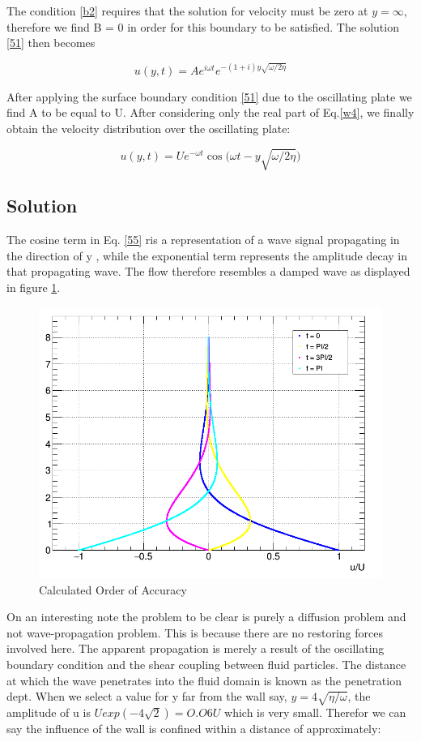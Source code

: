 \documentclass[paper=a4, fontsize=12pt, abstract=on]{scrartcl}
\numberwithin{equation}{section}		%
\numberwithin{figure}{section}			%
\numberwithin{table}{section}				%
\begin{document}
The condition \ref{b2} requires that the solution for velocity must be zero at $y = \infty$, therefore we find B = 0 in order for this boundary to be satisfied. The solution \ref{51} then becomes

\begin{equation}
\label{54}
u(y,t) = Ae^{i\omega t}e^{-(1+i)y\sqrt{\omega/2\eta}}
\end{equation}


After applying the surface boundary condition \ref{51} due to the oscillating plate we find A to be equal to U. After considering only the real part of Eq.\ref{w4}, we finally obtain the velocity distribution over the oscillating plate:

\begin{equation}
\label{55}
u(y,t) = Ue^{-\omega t}\cos\Big(\omega t - y\sqrt{\omega/2\eta}\Big)
\end{equation}

\subsection{Solution}

The cosine term in Eq. \ref{55} ris a representation of a wave signal propagating in the direction of y , while the exponential term represents the amplitude decay in that propagating wave. The flow therefore resembles a damped wave as displayed in figure \ref{q1}. 


\begin{figure}[H]
\centering
\includegraphics[width=0.70\linewidth]{q1}
\caption{Calculated Order of Accuracy}
\label{q1}
\end{figure}

On an interesting note the problem to be clear is purely a diffusion problem and not wave-propagation problem. This is because there are no restoring forces involved here. The apparent propagation is merely a result of the oscillating boundary condition and the shear coupling between fluid particles. The distance at which the wave penetrates into the fluid domain is known as the penetration dept. When we select a value for y far from the wall say, $y = 4\sqrt{\eta/\omega}$, the amplitude of u is $U exp(-4\sqrt{2}) = O.O6U$ which is very small. Therefor we can say the influence of the wall is confined within a distance of approximately:
\end{document}
